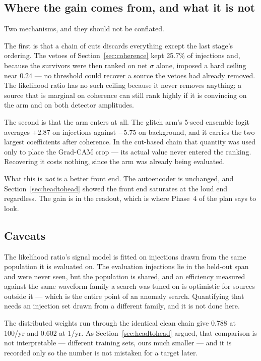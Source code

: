 \documentclass[11pt]{article}
\begin{document}
\subsection*{Where the gain comes from, and what it is not}

Two mechanisms, and they should not be conflated.

The first is that a chain of cuts discards everything except the last stage's ordering.
The vetoes of Section~\ref{sec:coherence} kept 25.7\% of injections and, because the
survivors were then ranked on net $\sigma$ alone, imposed a hard ceiling near $0.24$ ---
no threshold could recover a source the vetoes had already removed. The likelihood ratio
has no such ceiling because it never removes anything; a source that is marginal on
coherence can still rank highly if it is convincing on the arm and on both detector
amplitudes.

The second is that the arm enters at all. The glitch arm's 5-seed ensemble logit averages
$+2.87$ on injections against $-5.75$ on background, and it carries the two largest
coefficients after coherence. In the cut-based chain that quantity was used only to place
the Grad-CAM crop --- its actual value never entered the ranking. Recovering it costs
nothing, since the arm was already being evaluated.

What this is \emph{not} is a better front end. The autoencoder is unchanged, and
Section~\ref{sec:headtohead} showed the front end saturates at the loud end regardless.
The gain is in the readout, which is where Phase~4 of the plan says to look.

\subsection*{Caveats}

The likelihood ratio's signal model is fitted on injections drawn from the same
population it is evaluated on. The evaluation injections lie in the held-out span and
were never seen, but the population is shared, and an efficiency measured against the
same waveform family a search was tuned on is optimistic for sources outside it --- which
is the entire point of an anomaly search. Quantifying that needs an injection set drawn
from a different family, and it is not done here.

The distributed weights run through the identical clean chain give $0.788$ at 100/yr and
$0.602$ at 1/yr. As Section~\ref{sec:headtohead} argued, that comparison is not
interpretable --- different training sets, ours much smaller --- and it is recorded only
so the number is not mistaken for a target later.
\end{document}
